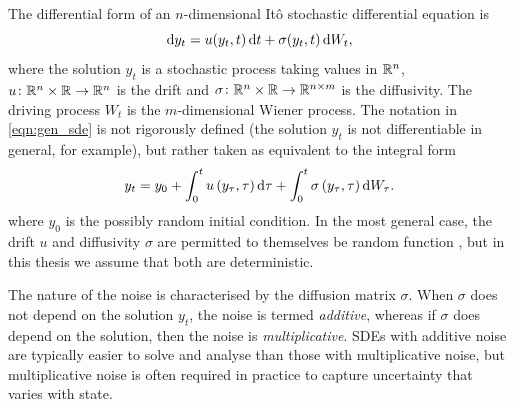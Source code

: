 The differential form of an \(n\)-dimensional It\^o stochastic differential equation is
\begin{equation}
	\dif y_t = u\!\left(y_t, t\right)\dif t + \sigma\!\left(y_t, t\right)\dif W_t,
	\label{eqn:gen_sde}
\end{equation}
where the solution \(y_t\) is a stochastic process taking values in \(\mathbb{R}^n\), \(u\colon \mathbb{R}^n \times \mathbb{R} \to \mathbb{R}^n\) is the drift and \(\sigma\colon \mathbb{R}^n \times \mathbb{R} \to \mathbb{R}^{n\times m}\) is the diffusivity.
The driving process \(W_t\) is the \(m\)-dimensional Wiener process.
The notation in \cref{eqn:gen_sde} is not rigorously defined (the solution \(y_t\) is not differentiable in general, for example), but rather taken as equivalent to the integral form
\begin{equation}
	y_t = y_0 + \int_0^t{u\left(y_\tau, \tau\right)\dif\tau} + \int_0^t{\sigma\left(y_\tau, \tau\right)\dif W_\tau}.
	\label{eqn:gen_sde_int}
\end{equation}
where \(y_0\) is the possibly random initial condition.
In the most general case, the drift \(u\) and diffusivity \(\sigma\) are permitted to themselves be random function%
, but in this thesis we assume that both are deterministic.

The nature of the noise is characterised by the diffusion matrix \(\sigma\).
When \(\sigma\) does not depend on the solution \(y_t\), the noise is termed \emph{additive}, whereas if \(\sigma\) does depend on the solution, then the noise is \emph{multiplicative}.
SDEs with additive noise are typically easier to solve and analyse than those with multiplicative noise, but multiplicative noise is often required in practice to capture uncertainty that varies with state.

